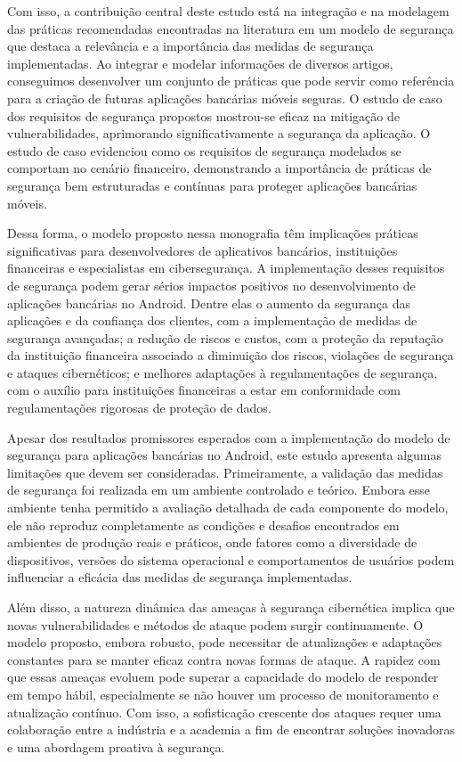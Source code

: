     Com isso, a contribuição central deste estudo está na integração e na modelagem das práticas recomendadas encontradas na literatura em um modelo de segurança que destaca a relevância e a importância das medidas de segurança implementadas. Ao integrar e modelar informações de diversos artigos, conseguimos desenvolver um conjunto de práticas que pode servir como referência para a criação de futuras aplicações bancárias móveis seguras. O estudo de caso dos requisitos de segurança propostos mostrou-se eficaz na mitigação de vulnerabilidades, aprimorando significativamente a segurança da aplicação. O estudo de caso evidenciou como os requisitos de segurança modelados se comportam no cenário financeiro, demonstrando a importância de práticas de segurança bem estruturadas e contínuas para proteger aplicações bancárias móveis.

    Dessa forma, o modelo proposto nessa monografia têm implicações práticas significativas para desenvolvedores de aplicativos bancários, instituições financeiras e especialistas em cibersegurança. A implementação desses requisitos de segurança podem gerar sérios impactos positivos no desenvolvimento de aplicações bancárias no Android. Dentre elas o aumento da segurança das aplicações e da confiança dos clientes, com a implementação de medidas de segurança avançadas; a redução de riscos e custos, com a proteção da reputação da instituição financeira associado a diminuição dos riscos, violações de segurança e ataques cibernéticos; e melhores adaptações à regulamentações de segurança, com o auxílio para instituições financeiras a estar em conformidade com regulamentações rigorosas de proteção de dados. 
    
    Apesar dos resultados promissores esperados com a implementação do modelo de segurança para aplicações bancárias no Android, este estudo apresenta algumas limitações que devem ser consideradas. Primeiramente, a validação das medidas de segurança foi realizada em um ambiente controlado e teórico. Embora esse ambiente tenha permitido a avaliação detalhada de cada componente do modelo, ele não reproduz completamente as condições e desafios encontrados em ambientes de produção reais e práticos, onde fatores como a diversidade de dispositivos, versões do sistema operacional e comportamentos de usuários podem influenciar a eficácia das medidas de segurança implementadas.
    
    Além disso, a natureza dinâmica das ameaças à segurança cibernética implica que novas vulnerabilidades e métodos de ataque podem surgir continuamente. O modelo proposto, embora robusto, pode necessitar de atualizações e adaptações constantes para se manter eficaz contra novas formas de ataque. A rapidez com que essas ameaças evoluem pode superar a capacidade do modelo de responder em tempo hábil, especialmente se não houver um processo de monitoramento e atualização contínuo. Com isso, a sofisticação crescente dos ataques requer uma colaboração entre a indústria e a academia a fim de encontrar soluções inovadoras e uma abordagem proativa à segurança.

